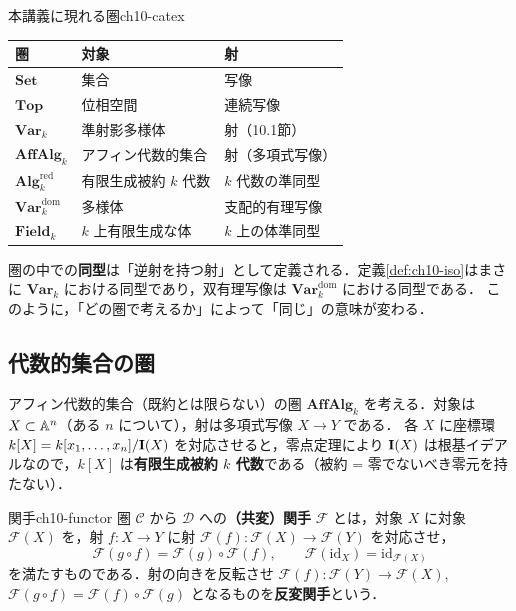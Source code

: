 \begin{myex}{本講義に現れる圏}{ch10-catex}
\begin{center}
\renewcommand{\arraystretch}{1.3}
\begin{tabular}{lll}
\hline
圏 & 対象 & 射 \\
\hline
$\mathbf{Set}$ & 集合 & 写像 \\
$\mathbf{Top}$ & 位相空間 & 連続写像 \\
$\mathbf{Var}_k$ & 準射影多様体 & 射（10.1節） \\
$\mathbf{AffAlg}_k$ & アフィン代数的集合 & 射（多項式写像） \\
$\mathbf{Alg}_k^{\mathrm{red}}$ & 有限生成被約 $k$ 代数 & $k$ 代数の準同型 \\
$\mathbf{Var}_k^{\mathrm{dom}}$ & 多様体 & 支配的有理写像 \\
$\mathbf{Field}_k$ & $k$ 上有限生成な体 & $k$ 上の体準同型 \\
\hline
\end{tabular}
\end{center}
\end{myex}

圏の中での\textbf{同型}は「逆射を持つ射」として定義される．定義\ref{def:ch10-iso}はまさに $\mathbf{Var}_k$ における同型であり，双有理写像は $\mathbf{Var}_k^{\mathrm{dom}}$ における同型である．
このように，「どの圏で考えるか」によって「同じ」の意味が変わる．

\subsection{代数的集合の圏}

アフィン代数的集合（既約とは限らない）の圏 $\mathbf{AffAlg}_k$ を考える．対象は $X\subset\mathbb{A}^n$（ある $n$ について），射は多項式写像 $X\to Y$ である．
各 $X$ に座標環 $k[X]=k[x_1,\dots,x_n]/\mathbf{I}(X)$ を対応させると，零点定理により $\mathbf{I}(X)$ は根基イデアルなので，$k[X]$ は\textbf{有限生成被約 $k$ 代数}である（被約 = 零でないべき零元を持たない）．

\begin{mydef}{関手}{ch10-functor}
圏 $\mathcal C$ から $\mathcal D$ への\textbf{（共変）関手} $\mathcal F$ とは，対象 $X$ に対象 $\mathcal F(X)$ を，射 $f:X\to Y$ に射 $\mathcal F(f):\mathcal F(X)\to\mathcal F(Y)$ を対応させ，
\[
  \mathcal F(g\circ f)=\mathcal F(g)\circ\mathcal F(f),\qquad \mathcal F(\mathrm{id}_X)=\mathrm{id}_{\mathcal F(X)}
\]
を満たすものである．射の向きを反転させ $\mathcal F(f):\mathcal F(Y)\to\mathcal F(X)$, $\mathcal F(g\circ f)=\mathcal F(f)\circ\mathcal F(g)$ となるものを\textbf{反変関手}という．
\end{mydef}

